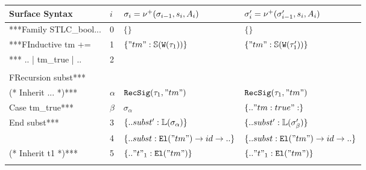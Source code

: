 \begin{table}[]
\begin{tabular}{|l|l|l|l|}
\hline
\rowcolor[HTML]{FFFFE6} 
Surface Syntax & $i$ & $\sigma_i = \nu^+({\sigma_{i-1}},{s_i},{A_i})$ & $\sigma_i' = \nu^+({\sigma_{i-1}'},{s_i},{A_i})$ \\ \hline
***Family STLC\_bool... & 0        & $\{\}$                                   & $\{\}$                                   \\ \cline{2-4} 
***FInductive tm +=     & 1        & $\{"tm" : \mathbb{S}({\texttt{W}({\tau_1})})\}$       & $\{"tm" : \mathbb{S}({\texttt{W}({\tau_1'})})\}$      \\ \cline{2-4} 
*** .. | tm\_true | ..  & 2        &                                          &                                          \\
                        &          &                                          &                                          \\ \cline{2-4} 
FRecursion subst***     &          &                                          &                                          \\ \cline{2-4} 
\rowcolor[HTML]{E0D7D7} 
(* Inherit ... *)***    & $\alpha$ & $\texttt{RecSig}({\tau_1},{"tm"})$                 & $\texttt{RecSig}({\tau_1},{"tm"})$                 \\ \cline{2-4} 
\rowcolor[HTML]{E0D7D7} 
Case tm\_true***        & $\beta$  & $\sigma_{\alpha}$                        & $\{.. "tm:true": \}$                     \\ \cline{2-4} 
End subst***            & 3        & $\{.. subst' : \mathbb{L}({\sigma_\alpha})\}$   & $\{.. subst' : \mathbb{L}({\sigma_\beta'})\}$   \\ \cline{2-4} 
                        & 4        & $\{.. subst : \texttt{El}({"tm"}) \to id \to ..\}$ & $\{.. subst : \texttt{El}({"tm"}) \to id \to ..\}$ \\ \cline{2-4} 
(* Inherit t1 *)***     & 5        & $\{.. "t"_1 : \texttt{El}({"tm"})\}$               & $\{.. "t"_1 : \texttt{El}({"tm"})\}$               \\
                        &          &                                          &                                          \\ \hline
\end{tabular}
\end{table}


